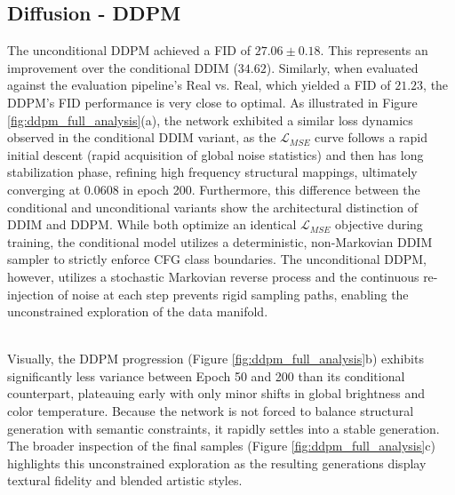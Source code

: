 \documentclass[runningheads]{llncs}
\begin{document}
\subsection{Diffusion - DDPM}


The unconditional DDPM achieved a FID of $27.06 \pm 0.18$. This represents an improvement over the conditional DDIM ($34.62$). Similarly, when evaluated against the evaluation pipeline's Real vs. Real, which yielded a FID of $21.23$, the DDPM’s FID performance is very close to optimal. 
As illustrated in Figure \ref{fig:ddpm_full_analysis}(a), the network exhibited a similar loss dynamics observed in the conditional DDIM variant, as the $\mathcal{L}_{MSE}$ curve follows a rapid initial descent (rapid acquisition of global noise statistics) and then has long stabilization phase, refining high frequency structural mappings, ultimately converging at $0.0608$ in epoch 200. Furthermore, this difference between the conditional and unconditional variants show the architectural distinction of DDIM and DDPM. While both optimize an identical $\mathcal{L}_{MSE}$ objective during training, the conditional model utilizes a deterministic, non-Markovian DDIM sampler to strictly enforce CFG class boundaries. The unconditional DDPM, however, utilizes a stochastic Markovian reverse process and the continuous re-injection of noise at each step prevents rigid sampling paths, enabling the unconstrained exploration of the data manifold.

\noindent
\\
Visually, the DDPM progression (Figure \ref{fig:ddpm_full_analysis}b) exhibits significantly less variance between Epoch 50 and 200 than its conditional counterpart, plateauing early with only minor shifts in global brightness and color temperature. Because the network is not forced to balance structural generation with semantic constraints, it rapidly settles into a stable generation. The broader inspection of the final samples (Figure \ref{fig:ddpm_full_analysis}c) highlights this unconstrained exploration as the resulting generations display textural fidelity and blended artistic styles. 
\end{document}
